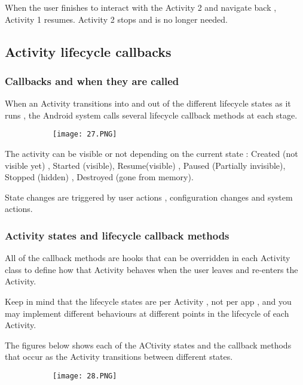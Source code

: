 \documentclass{article}
\begin{document}
When the user finishes to interact with the Activity 2 and navigate back , Activity 1 resumes. Activity 2 stops and is no longer needed.

\subsection{Activity lifecycle callbacks}

\subsubsection{Callbacks and when they are called}

When an Activity transitions into and out of the different lifecycle states as it runs , the Android system calls several lifecycle callback methods at each stage.



      \begin{figure}[ht!]
  \centering
  \begin{subfigure}[b]{0.7\linewidth}
    \texttt{[image: 27.PNG]}
  \end{subfigure}
  \end{figure}

The activity can be visible or not depending on the current state : Created (not visible yet) , Started (visible), Resume(visible) , Paused (Partially invisible), Stopped (hidden) , Destroyed (gone from memory).

State changes are triggered by user actions , configuration changes and system actions.

\subsubsection{Activity states and lifecycle callback methods}

All of the callback methods are hooks that can be overridden in each Activity class to define how that Activity behaves when the user leaves and re-enters the Activity.

Keep in mind that the lifecycle states are per Activity , not per app , and you may implement different behaviours at different points in the lifecycle of each Activity.

The figures below shows each of the ACtivity states and the callback methods that occur as the Activity transitions between different states.


      \begin{figure}[ht!]
  \centering
  \begin{subfigure}[b]{0.8\linewidth}
    \texttt{[image: 28.PNG]}
  \end{subfigure}
  \end{figure}
\end{document}
